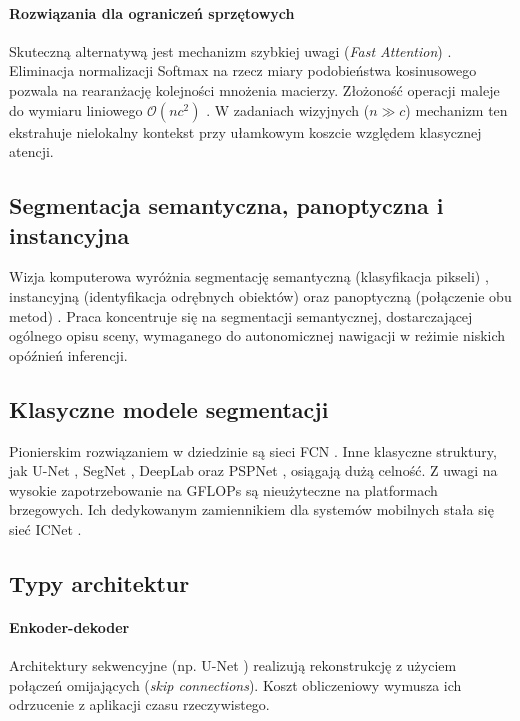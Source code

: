 \paragraph{Rozwiązania dla ograniczeń sprzętowych}
Skuteczną alternatywą jest mechanizm szybkiej uwagi (\textit{Fast Attention}) . Eliminacja normalizacji Softmax na rzecz miary podobieństwa kosinusowego pozwala na rearanżację kolejności mnożenia macierzy. Złożoność operacji maleje do wymiaru liniowego $\mathcal{O}(nc^2)$ . W zadaniach wizyjnych ($n \gg c$) mechanizm ten ekstrahuje nielokalny kontekst przy ułamkowym koszcie względem klasycznej atencji.

\subsection{Segmentacja semantyczna, panoptyczna i instancyjna}
Wizja komputerowa wyróżnia segmentację semantyczną (klasyfikacja pikseli) , instancyjną (identyfikacja odrębnych obiektów)  oraz panoptyczną (połączenie obu metod) . Praca koncentruje się na segmentacji semantycznej, dostarczającej ogólnego opisu sceny, wymaganego do autonomicznej nawigacji w reżimie niskich opóźnień inferencji.

\subsection{Klasyczne modele segmentacji}
Pionierskim rozwiązaniem w dziedzinie są sieci FCN . Inne klasyczne struktury, jak U-Net , SegNet , DeepLab  oraz PSPNet , osiągają dużą celność. Z uwagi na wysokie zapotrzebowanie na GFLOPs są nieużyteczne na platformach brzegowych. Ich dedykowanym zamiennikiem dla systemów mobilnych stała się sieć ICNet .

\subsection{Typy architektur}

\paragraph{Enkoder-dekoder}
Architektury sekwencyjne (np. U-Net ) realizują rekonstrukcję z użyciem połączeń omijających (\textit{skip connections}). Koszt obliczeniowy wymusza ich odrzucenie z aplikacji czasu rzeczywistego.

